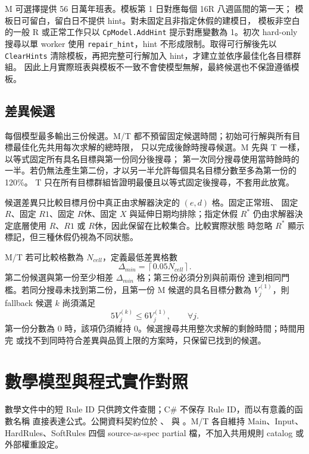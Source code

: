 \documentclass[a4paper,12pt]{article}
\begin{document}
M 可選擇提供 56 日萬年班表。模板第 1 日對應每個 16R 八週區間的第一天；
模板日可留白，留白日不提供 hint。對未固定且非指定休假的建模日，
模板非空白的一般 R 或正常工作只以
\texttt{CpModel.AddHint} 提示對應變數為 1。初次 hard-only 搜尋以單 worker 使用
\texttt{repair\_hint}，hint 不形成限制。取得可行解後先以
\texttt{ClearHints} 清除模板，再把完整可行解加入 hint，才建立並依序最佳化各目標群組。
因此上月實際班表與模板不一致不會使模型無解，最終候選也不保證遵循模板。

\subsection{差異候選}

每個模型最多輸出三份候選。M/T 都不預留固定候選時間；初始可行解與所有目標最佳化先共用每次求解的總時限，
只以完成後餘時搜尋候選。M 先與 T 一樣，以等式固定所有具名目標與第一份同分後搜尋；
第一次同分搜尋使用當時餘時的一半。若仍無法產生第二份，才以另一半允許每個具名目標分數至多為第一份的 120\%。
T 只在所有目標群組皆證明最優且以等式固定後搜尋，不套用此放寬。

候選差異只比較目標月份中真正由求解器決定的 \((e,d)\) 格。固定正常班、
固定 \(R\)、固定 \(R1\)、固定 \(R休\)、固定 \(X\) 與延伸日期均排除；指定休假 \(R^*\)
仍由求解器決定底層使用 \(R\)、\(R1\) 或 \(R休\)，因此保留在比較集合。比較實際狀態
時忽略 \(R^*\) 顯示標記，但三種休假仍視為不同狀態。

M/T 若可比較格數為 \(N_{cell}\)，定義最低差異格數
\[
  \Delta_{min}=\left\lceil0.05N_{cell}\right\rceil.
\]
第二份候選與第一份至少相差 \(\Delta_{min}\) 格；第三份必須分別與前兩份
達到相同門檻。若同分搜尋未找到第二份，且第一份 M 候選的具名目標分數為 \(V_j^{(1)}\)，則 fallback
候選 \(k\) 尚須滿足
\[
  5V_j^{(k)}\leq6V_j^{(1)},\qquad\forall j.
\]
第一份分數為 0 時，該項仍須維持 0。候選搜尋共用整次求解的剩餘時間；時間用完
或找不到同時符合差異與品質上限的方案時，只保留已找到的候選。

\section{數學模型與程式實作對照}

數學文件中的短 Rule ID 只供跨文件查閱；C\# 不保存 Rule ID，而以有意義的函數名稱
直接表達公式。公開資料契約位於 、
與 。M/T 各自維持 Main、Input、HardRules、SoftRules 四個
source-as-spec partial 檔，不加入共用規則 catalog 或外部權重設定。
\end{document}
